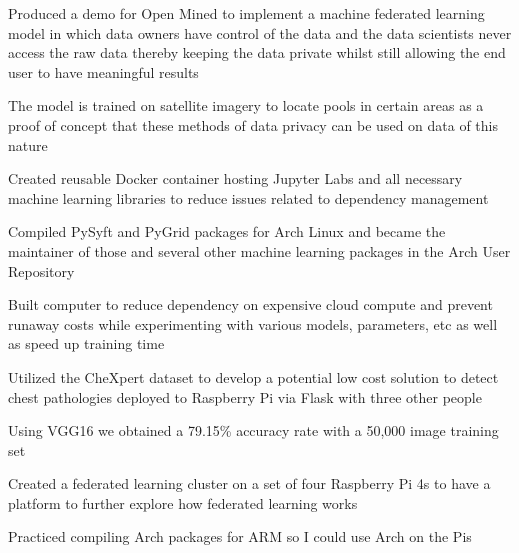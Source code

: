 \documentclass[letterpaper]{resume}
\begin{document}
\begin{compactitem}
\item Produced a demo for Open Mined to implement a machine federated learning model in which data owners have control of the data and the data scientists never access the raw data thereby keeping the data private whilst still allowing the end user to have meaningful results
\item The model is trained on satellite imagery to locate pools in certain areas as a proof of concept that these methods of data privacy can be used on data of this nature
\item Created reusable Docker container hosting Jupyter Labs and all necessary machine learning libraries to reduce issues related to dependency management
\item Compiled PySyft and PyGrid packages for Arch Linux and became the maintainer of those and several other machine learning packages in the Arch User Repository
\item Built computer to reduce dependency on expensive cloud compute and prevent runaway costs while experimenting with various models, parameters, etc as well as speed up training time
\end{compactitem}

\begin{compactitem}
\item Utilized the CheXpert dataset to develop a potential low cost solution to detect chest pathologies deployed to Raspberry Pi via Flask with three other people
\item Using VGG16 we obtained a 79.15\% accuracy rate with a 50,000 image training set
\end{compactitem}


\begin{compactitem}
\item Created a federated learning cluster on a set of four Raspberry Pi 4s to have a platform to further explore how federated learning works
\item Practiced compiling Arch packages for ARM so I could use Arch on the Pis
\end{compactitem}
\end{document}

